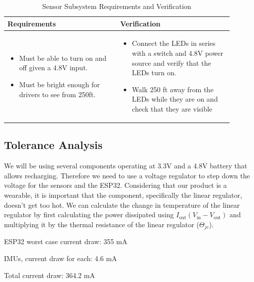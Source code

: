 \documentclass[12pt]{article}
\begin{document}
    \begin{table}[h]
        \centering
        \caption{Sensor Subsystem Requirements and Verification}
        \begin{tabular}{p{0.45\linewidth}p{0.45\linewidth}}
        \toprule
        \textbf{Requirements} & \textbf{Verification} \\
        \midrule
        \begin{itemize}[leftmargin=*, nosep, after=\strut]
            \item Must be able to turn on and off given a 4.8V input.
            \item Must be bright enough for drivers to see from 250ft.
            
        \end{itemize} &
        \begin{itemize}[leftmargin=*, nosep, after=\strut]
            \item Connect the LEDs in series with a switch and 4.8V power source and verify that the LEDs turn on.
            \item Walk 250 ft away from the LEDs while they are on and check that they are visible
        
        \end{itemize} \\
        \bottomrule
        \end{tabular}
        \end{table}

\subsection{Tolerance Analysis}
We will be using several components operating at 3.3V and a 4.8V 
battery that allows recharging. Therefore we need to use a 
voltage regulator to step down the voltage for the sensors 
and the ESP32. Considering that our product is a wearable, it is important that the component, specifically the linear regulator, doesn't get too hot. We can calculate the change in temperature of the linear regulator by first calculating the power dissipated using $I_{\text{out}} (V_{\text{in}} - V_{\text{out}})$ and multiplying it by the thermal resistance of the linear regulator ($\Theta_{jc}$).

\noindent ESP32 worst case current draw: 355 mA

 IMUs, current draw for each: 4.6 mA

\noindent Total current draw: 364.2 mA
\end{document}
